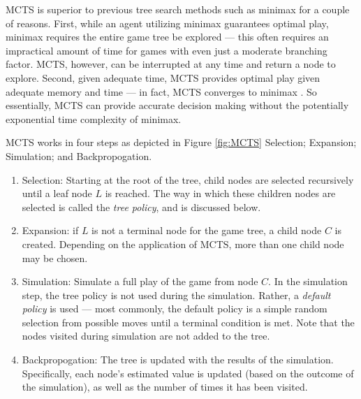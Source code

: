 MCTS is superior to previous tree search methods such as minimax for a couple of reasons.  First, while an agent utilizing minimax guarantees optimal play, minimax requires the entire game tree be explored --- this often requires an impractical amount of time for games with even just a moderate branching factor.  MCTS, however, can be interrupted at any time and return a node to explore.  Second, given adequate time, MCTS provides optimal play given adequate memory and time --- in fact, MCTS converges to minimax \cite{browne2012survey}.  So essentially, MCTS can provide accurate decision making without the potentially exponential time complexity of minimax.  

MCTS works in four steps as depicted in Figure \ref{fig:MCTS} Selection; Expansion; Simulation; and Backpropogation.
\begin{enumerate}
    \item  Selection: Starting at the root of the tree, child nodes are selected recursively until a leaf node $L$ is reached.  The way in which these children nodes are selected is called the \textit{tree policy}, and is discussed below.
    
    \item Expansion: if $L$ is not a terminal node for the game tree, a child node $C$ is created.  Depending on the application of MCTS, more than one child node may be chosen.
    
    \item Simulation: Simulate a full play of the game from node $C$.  In the simulation step, the tree policy is not used during the simulation.  Rather, a \textit{default policy} is used --- most commonly, the default policy is a simple random selection from possible moves until a terminal condition is met.  Note that the nodes visited during simulation are not added to the tree.
    
    \item Backpropogation: The tree is updated with the results of the simulation.  Specifically, each node's estimated value is updated (based on the outcome of the simulation), as well as the number of times it has been visited.
\end{enumerate}


